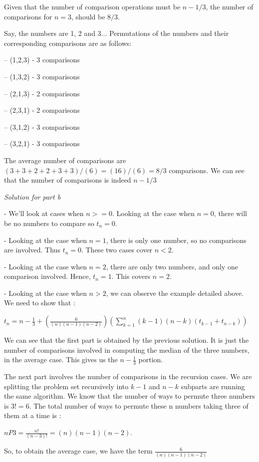 \documentclass[11pt]{article}
\begin{document}
Given that the number of comparison operations must be $n - 1/3$, the number of comparisons for $n=3$, should be $8/3$.

Say, the numbers are 1, 2 and 3... 
Permutations of the numbers and their corresponding comparisons are as follows:

-- (1,2,3) - 3 comparisons

-- (1,3,2) - 3 comparisons

-- (2,1,3) - 2 comparisons

-- (2,3,1) - 2 comparisons

-- (3,1,2) - 3 comparisons

-- (3,2,1) - 3 comparisons

The average number of comparisons are $(3+3+2+2+3+3)/(6) = (16)/(6) = 8/3$ comparisons.
We can see that the number of comparisons is indeed $n-1/3$

\medskip
\medskip

\textit{Solution for part b}

- We'll look at cases when $n>=0$. Looking at the case when $n=0$, there will be no numbers to compare so $t_n = 0$. 

- Looking at the case when $n=1$, there is only one number, so no comparisons are involved. Thus $t_n = 0$. These two cases cover $n<2$.

- Looking at the case when $n=2$, there are only two numbers, and only one comparison involved. Hence, $t_n = 1$. This covers $n=2$.

- Looking at the case when $n>2$, we can observe the example detailed above. We need to show that :

$t_n = n - \frac{1}{3} + (\frac{6}{(n)(n-1)(n-2)})(\sum_{k=1}^{n} {(k-1)(n-k)(t_{k-1}+t_{n-k})})$ 

We can see that the first part is obtained by the previous solution. It is just the number of comparisons involved in computing the median of the three numbers, in the average case. This gives us the $n-\frac{1}{3}$ portion.

The next part involves the number of comparisons in the recursion cases. We are splitting the problem set recursively into $k-1$ and $n-k$ subparts are running the same algorithm. We know that the number of ways to permute three numbers is $3! = 6$. The total number of ways to permute these n numbers taking three of them at a time is :

$nP3 = \frac{n!}{(n-3)!} = (n)(n-1)(n-2)$.

So, to obtain the average case, we have the term $\frac{6}{(n)(n-1)(n-2)}$
\end{document}

